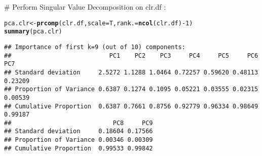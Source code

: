 \documentclass[a4paper,oneside,12pt,titlepage]{article}\usepackage[]{graphicx}\usepackage[]{color}
\makeatletter
\newcommand{\hlnum}[1]{\textcolor[rgb]{0.686,0.059,0.569}{#1}}%
\newcommand{\hlopt}[1]{\textcolor[rgb]{0,0,0}{#1}}%
\newcommand{\hlstd}[1]{\textcolor[rgb]{0.345,0.345,0.345}{#1}}%
\newcommand{\hlkwb}[1]{\textcolor[rgb]{0.69,0.353,0.396}{#1}}%
\newcommand{\hlkwc}[1]{\textcolor[rgb]{0.333,0.667,0.333}{#1}}%
\newcommand{\hlkwd}[1]{\textcolor[rgb]{0.737,0.353,0.396}{\textbf{#1}}}%
\newenvironment{kframe}{%
 \def\at@end@of@kframe{}%
 \ifinner\ifhmode%
  \def\at@end@of@kframe{\end{minipage}}%
  \begin{minipage}{\columnwidth}%
 \fi\fi%
 \def\FrameCommand##1{\hskip\@totalleftmargin \hskip-\fboxsep
 \colorbox{shadecolor}{##1}\hskip-\fboxsep
     \hskip-\linewidth \hskip-\@totalleftmargin \hskip\columnwidth}%
 \MakeFramed {\advance\hsize-\width
   \@totalleftmargin\z@ \linewidth\hsize
   \@setminipage}}%
 {\par\unskip\endMakeFramed%
 \at@end@of@kframe}
\newenvironment{knitrout}{}{} %
\makeatother
\begin{document}
# Perform Singular Value Decomposition on clr.df : 


\begin{knitrout}
\color{fgcolor}\begin{kframe}
\begin{alltt}
\hlstd{pca.clr} \hlkwb{<-} \hlkwd{prcomp}\hlstd{(clr.df,}\hlkwc{scale} \hlstd{= T,}\hlkwc{rank.} \hlstd{=} \hlkwd{ncol}\hlstd{(clr.df)}\hlopt{-}\hlnum{1} \hlstd{)}
\hlkwd{summary}\hlstd{(pca.clr)}
\end{alltt}
\begin{verbatim}
## Importance of first k=9 (out of 10) components:
##                           PC1    PC2    PC3     PC4     PC5     PC6     PC7
## Standard deviation     2.5272 1.1288 1.0464 0.72257 0.59620 0.48113 0.23209
## Proportion of Variance 0.6387 0.1274 0.1095 0.05221 0.03555 0.02315 0.00539
## Cumulative Proportion  0.6387 0.7661 0.8756 0.92779 0.96334 0.98649 0.99187
##                            PC8     PC9
## Standard deviation     0.18604 0.17566
## Proportion of Variance 0.00346 0.00309
## Cumulative Proportion  0.99533 0.99842
\end{verbatim}
\end{kframe}
\end{knitrout}
\end{document}
